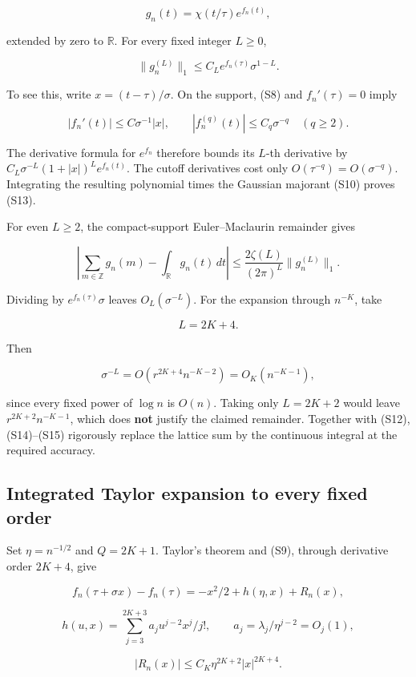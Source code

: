 \[
 g_n(t)=\chi(t/\tau)e^{f_n(t)},
\]

extended by zero to \(\mathbb R\). For every fixed integer \(L\ge0\),

\[
 \|g_n^{(L)}\|_1\le C_L e^{f_n(\tau)}\sigma^{1-L}. \tag{S13}
\]

To see this, write \(x=(t-\tau)/\sigma\). On the support, (S8) and
\(f_n'(\tau)=0\) imply

\[
 |f_n'(t)|\le C\sigma^{-1}|x|,\qquad
 |f_n^{(q)}(t)|\le C_q\sigma^{-q}\quad(q\ge2).
\]

The derivative formula for \(e^{f_n}\) therefore bounds its \(L\)-th
derivative by \(C_L\sigma^{-L}(1+|x|)^L e^{f_n(t)}\). The cutoff
derivatives cost only \(O(\tau^{-q})=O(\sigma^{-q})\). Integrating the
resulting polynomial times the Gaussian majorant (S10) proves (S13).

For even \(L\ge2\), the compact-support Euler--Maclaurin remainder gives

\[
 \left|\sum_{m\in\mathbb Z}g_n(m)-\int_{\mathbb R}g_n(t)\,dt\right|
 \le\frac{2\zeta(L)}{(2\pi)^L}\|g_n^{(L)}\|_1. \tag{S14}
\]

Dividing by \(e^{f_n(\tau)}\sigma\) leaves \(O_L(\sigma^{-L})\). For the
expansion through \(n^{-K}\), take

\[
 L=2K+4.
\]

Then

\[
 \sigma^{-L}=O\left(r^{2K+4}n^{-K-2}\right)=O_K(n^{-K-1}), \tag{S15}
\]

since every fixed power of \(\log n\) is \(O(n)\). Taking only
\(L=2K+2\) would leave \(r^{2K+2}n^{-K-1}\), which does \textbf{not}
justify the claimed remainder. Together with (S12), (S14)--(S15)
rigorously replace the lattice sum by the continuous integral at the
required accuracy.

\subsection{Integrated Taylor expansion to every fixed
order}\label{tcl:integrated-taylor-expansion-to-every-fixed-order}

Set \(\eta=n^{-1/2}\) and \(Q=2K+1\). Taylor's theorem and (S9), through
derivative order \(2K+4\), give

\[
 f_n(\tau+\sigma x)-f_n(\tau)
 =-x^2/2+h(\eta,x)+R_n(x),
\]

\[
 h(u,x)=\sum_{j=3}^{2K+3}a_j u^{j-2}x^j/j!,\qquad
 a_j=\lambda_j/\eta^{j-2}=O_j(1),
\]

\[
 |R_n(x)|\le C_K\eta^{2K+2}|x|^{2K+4}. \tag{S16}
\]

